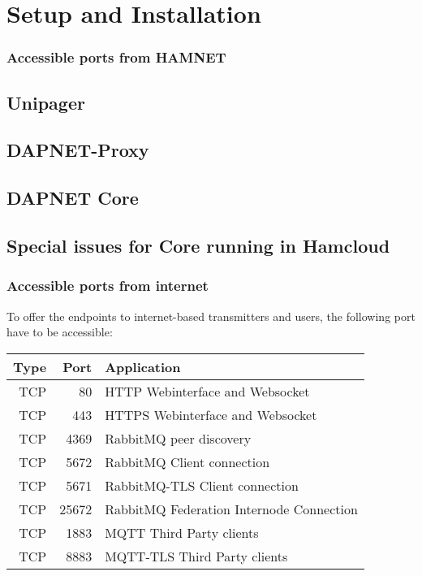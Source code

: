 \chapter{Setup and Installation}


\subsection{Accessible ports from HAMNET}

\section{Unipager}

\section{DAPNET-Proxy}

\section{DAPNET Core}

\section{Special issues for Core running in Hamcloud}

\subsection{Accessible ports from internet}
To offer the endpoints to internet-based transmitters and users, the following port have to be accessible:

\begin{tabular}{r|r|l}
Type & Port & Application\\
\hline
TCP & 80 & HTTP Webinterface and Websocket\\
TCP & 443 & HTTPS Webinterface  and Websocket\\
TCP & 4369 & RabbitMQ peer discovery\\
TCP & 5672 & RabbitMQ Client connection\\
TCP & 5671 & RabbitMQ-TLS Client connection\\
TCP & 25672 & RabbitMQ Federation Internode Connection\\
TCP & 1883 & MQTT Third Party clients\\
TCP & 8883 & MQTT-TLS Third Party clients\\
\end{tabular}


